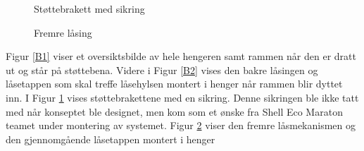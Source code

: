 \begin{figure}[H]
\centering   
{}
\caption{Støttebrakett med sikring}
\label{B3}
\end{figure}
\begin{figure}[H]
\centering   
{}
\caption{Fremre låsing}
\label{B4}
\end{figure}
Figur \ref{B1} viser et oversiktsbilde av hele hengeren samt rammen når den er dratt ut og står på støttebena.
Videre i Figur \ref{B2} vises den bakre låsingen og låsetappen som skal treffe låsehylsen montert i henger når rammen blir dyttet inn. I Figur \ref{B3} vises støttebrakettene med en sikring. Denne sikringen ble ikke tatt med når konseptet ble designet, men kom som et ønske fra Shell Eco Maraton teamet under montering av systemet. 
Figur \ref{B4} viser den fremre låsmekanismen og den gjennomgående låsetappen montert i henger

